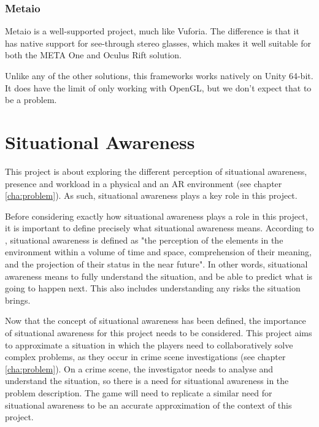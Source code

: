 			\subsubsection{Metaio} \label{sssec:metaio}
				Metaio is a well-supported project, much like Vuforia. The
				difference is that it has native support for see-through stereo
				glasses, which makes it well suitable for both the META One and
				Oculus Rift solution. \cite{metaio}

				Unlike any of the other solutions, this frameworks works
				natively on Unity 64-bit. It does have the limit of only working
				with OpenGL, but we don't expect that to be a problem.


	\section{Situational Awareness} \label{sec:awareness}
		This project is about exploring the different perception of situational
		awareness, presence and workload in a physical and an AR environment
		(see chapter \ref{cha:problem}). As such, situational awareness plays a
		key role in this project.

		Before considering exactly how situational awareness plays a role in this
		project, it is important to define precisely what situational awareness
		means. According to \cite{endsley}, situational awareness is defined as
		"the perception of the elements in the environment within a volume of
		time and space, comprehension of their meaning, and the projection of
		their status in the near future". In other words, situational awareness
		means to fully understand the situation, and be able to predict what is
		going to happen next. This also includes understanding any risks the
		situation brings.

		Now that the concept of situational awareness has been defined, the
		importance of situational awareness for this project needs to be
		considered. This project aims to approximate a situation in which the
		players need to collaboratively solve complex problems, as they occur in
		crime scene investigations (see chapter \ref{cha:problem}). On a crime
		scene, the investigator needs to analyse and understand the situation,
		so there is a need for situational awareness in the problem description.
		The game will need to replicate a similar need for situational awareness
		to be an accurate approximation of the context of this project.

